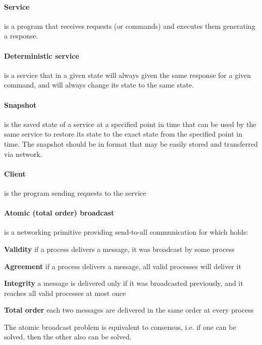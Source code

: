 \paragraph{Service}
is a program that receives requests (or commands) and executes them generating a response.

\paragraph{Deterministic service}
is a service that in a given state will always given the same response for a given command, and will always change its state to the same state.

\paragraph{Snapshot}
is the saved state of a service at a specified point in time that can be used by the same service to restore its state to the exact state from the specified point in time. The snapshot should be in format that may be easily stored and transferred via network.

\paragraph{Client}
is the program sending requests to the service

\paragraph{Atomic (total order) broadcast}
is a networking primitive providing send-to-all communication for which holds:
\begin{tightList}[\setlength{\leftmargin}{2\leftmargin}]
 \item[\textbf{Validity}] if a process delivers a message, it was broadcast by some process
 \item[\textbf{Agreement}] if a process delivers a message, all valid processes will deliver it
 \item[\textbf{Integrity}] a message is delivered only if it was broadcasted previously, and it reaches all valid processes at most once
 \item[\textbf{Total order}] each two messages are delivered in the same order at every process
\end{tightList}

\noindent The atomic broadcast problem is equivalent to consensus, i.e. if one can be solved, then the other also can be solved.

